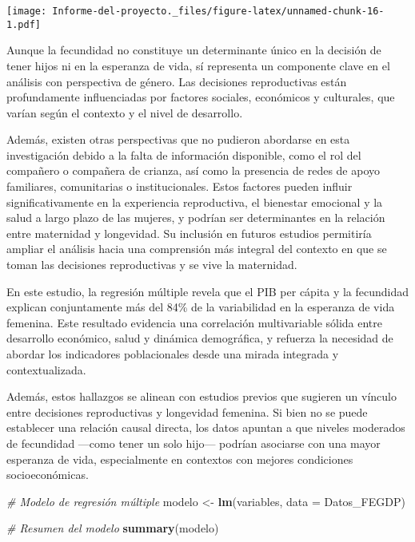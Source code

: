 \documentclass[
]{article}
\newenvironment{Shaded}{\begin{snugshade}}{\end{snugshade}}
\newcommand{\AttributeTok}[1]{\textcolor[rgb]{0.13,0.29,0.53}{#1}}
\newcommand{\CommentTok}[1]{\textcolor[rgb]{0.56,0.35,0.01}{\textit{#1}}}
\newcommand{\FunctionTok}[1]{\textcolor[rgb]{0.13,0.29,0.53}{\textbf{#1}}}
\newcommand{\NormalTok}[1]{#1}
\newcommand{\OtherTok}[1]{\textcolor[rgb]{0.56,0.35,0.01}{#1}}
\begin{document}
\texttt{[image: Informe-del-proyecto.\_files/figure-latex/unnamed-chunk-16-1.pdf]}

Aunque la fecundidad no constituye un determinante único en la decisión
de tener hijos ni en la esperanza de vida, sí representa un componente
clave en el análisis con perspectiva de género. Las decisiones
reproductivas están profundamente influenciadas por factores sociales,
económicos y culturales, que varían según el contexto y el nivel de
desarrollo.

Además, existen otras perspectivas que no pudieron abordarse en esta
investigación debido a la falta de información disponible, como el rol
del compañero o compañera de crianza, así como la presencia de redes de
apoyo familiares, comunitarias o institucionales. Estos factores pueden
influir significativamente en la experiencia reproductiva, el bienestar
emocional y la salud a largo plazo de las mujeres, y podrían ser
determinantes en la relación entre maternidad y longevidad. Su inclusión
en futuros estudios permitiría ampliar el análisis hacia una comprensión
más integral del contexto en que se toman las decisiones reproductivas y
se vive la maternidad.

En este estudio, la regresión múltiple revela que el PIB per cápita y la
fecundidad explican conjuntamente más del 84\% de la variabilidad en la
esperanza de vida femenina. Este resultado evidencia una correlación
multivariable sólida entre desarrollo económico, salud y dinámica
demográfica, y refuerza la necesidad de abordar los indicadores
poblacionales desde una mirada integrada y contextualizada.

Además, estos hallazgos se alinean con estudios previos que sugieren un
vínculo entre decisiones reproductivas y longevidad femenina. Si bien no
se puede establecer una relación causal directa, los datos apuntan a que
niveles moderados de fecundidad ---como tener un solo hijo--- podrían
asociarse con una mayor esperanza de vida, especialmente en contextos
con mejores condiciones socioeconómicas.

\begin{Shaded}
\begin{Highlighting}[]
\CommentTok{\# Modelo de regresión múltiple}
\NormalTok{modelo }\OtherTok{\textless{}{-}} \FunctionTok{lm}\NormalTok{(variables, }\AttributeTok{data =}\NormalTok{ Datos\_FEGDP)}

\CommentTok{\# Resumen del modelo}
\FunctionTok{summary}\NormalTok{(modelo)}
\end{Highlighting}
\end{Shaded}
\end{document}
